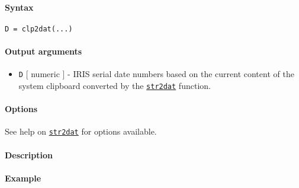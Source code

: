 


	\paragraph{Syntax}

\begin{verbatim}
D = clp2dat(...)
\end{verbatim}

\paragraph{Output arguments}

\begin{itemize}
\itemsep1pt\parskip0pt
\item
  \texttt{D} {[} numeric {]} - IRIS serial date numbers based on the
  current content of the system clipboard converted by the
  \href{dates/str2dat}{\texttt{str2dat}} function.
\end{itemize}

\paragraph{Options}

See help on \href{dates/str2dat}{\texttt{str2dat}} for options
available.

\paragraph{Description}

\paragraph{Example}


